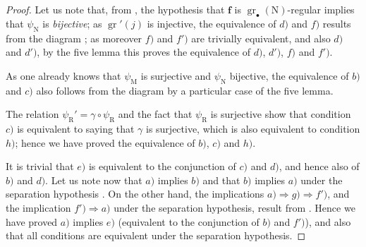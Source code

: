 \begin{proof}
Let us note that, from , the hypothesis that $\mathbf{f}$ is $\operatorname{gr}_\bullet(\mathrm{N})$-regular implies that $\psi_\mathrm{N}$ is \emph{bijective}; as $\operatorname{gr}'(j)$ is injective, the equivalence of $d)$ and $f)$ results from the diagram ; as moreover $f)$ and $f')$ are trivially equivalent, and also $d)$ and $d')$, by the five lemma this proves the equivalence of $d)$, $d')$, $f)$ and $f')$.

As one already knows that $\psi_\mathrm{M}$ is surjective and $\psi_\mathrm{N}$ bijective, the equivalence of $b)$ and $c)$ also follows from the diagram  by a particular case of the five lemma.

The relation $\psi_\mathrm{R}'=\gamma\circ\psi_\mathrm{R}$  and the fact that $\psi_\mathrm{R}$ is surjective show that condition $c)$ is equivalent to saying that $\gamma$ is surjective, which is also equivalent to condition $h)$; hence we have proved the equivalence of $b)$, $c)$ and $h)$.

It is trivial that $e)$ is equivalent to the conjunction of $c)$ and $d)$, and hence also of $b)$ and $d)$. Let us note now that $a)$ implies $b)$ and that $b)$ implies $a)$ under the separation hypothesis . On the other hand, the implications $a)\Rightarrow g)\Rightarrow f')$, and the implication $f')\Rightarrow a)$ under the separation hypothesis, result from . Hence we have proved $a)$ implies $e)$ (equivalent to the conjunction of $b)$ and $f')$), and also that all conditions are equivalent under the separation hypothesis.
\end{proof}

